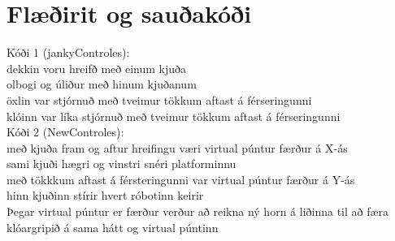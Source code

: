 \section{Flæðirit og sauðakóði}
Kóði 1 (jankyControles): \\
dekkin voru hreifð með einum kjuða \\
olbogi og úliður með hinum kjuðanum \\
öxlin var stjórnuð með tveimur tökkum aftast á férseringunni \\
klóinn var líka stjórnuð með tveimur tökkum aftast á férseringunni \\
Kóði 2 (NewControles): \\
með kjuða fram og aftur hreifingu væri virtual púntur færður á X-ás \\
sami kjuði hægri og vinstri snéri platforminnu \\
með tökkkum aftast á férsteringunni var virtual púntur færður á Y-ás \\
hinn kjuðinn stírir hvert róbotinn keirir \\
Þegar virtual púntur er færður verður að reikna ný horn á liðinna til að færa klóargripið á sama hátt og virtual púntinn \\

